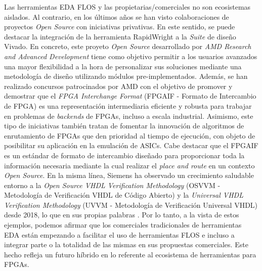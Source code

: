 Las herramientas EDA FLOS y las propietarias/comerciales no son ecosistemas aislados.
Al contrario, en los últimos años se han visto colaboraciones de proyectos \textit{Open Source} con iniciativas privativas.
En este sentido, se puede destacar la integración de la herramienta RapidWright \cite{gh:rapid} a la \textit{Suite} de diseño Vivado.
En concreto, este proyeto \textit{Open Source} desarrollado por \textit{AMD Research and Advanced Development} tiene como objetivo permitir a los usuarios avanzados una mayor flexibilidad a la hora de personalizar sus soluciones mediante una metodología de diseño utilizando módulos pre-implementados.
Además, se han realizado concursos \cite{contest} patrocinados por AMD con el objetivo de promover y demostrar que el \textit{FPGA Interchange Format} (FPGAIF - Formato de Intercambio de FPGA) \cite{FPGAIF} es una representación intermediaria eficiente y robusta para trabajar en problemas de \textit{backends} de FPGAs, incluso a escala industrial.
Asimismo, este tipo de iniciativas también tratan de fomentar la innovación de algoritmos de enrutamiento de FPGAs que den prioridad al tiempo de ejecución, con objeto de posibilitar su aplicación en la emulación de ASICs.
Cabe destacar que el FPGAIF es un estándar de formato de intercambio diseñado para proporcionar toda la información necesaria mediante la cual realizar el \textit{place and route} en un contexto \textit{Open Source}.
En la misma línea, Siemens ha observado un crecimiento saludable entorno a la \textit{Open Source VHDL Verification Methodology} (OSVVM - Metodología de Verificación VHDL de Código Abierto) \cite{osvvm} y la \textit{Universal VHDL Verification Methodology} (UVVM -  Metodología de Verificación Universal VHDL) \cite{uvvm} desde 2018, lo que en sus propias palabras  \cite{wilson-research}.
Por lo tanto, a la vista de estos ejemplos, podemos afirmar que los comerciales tradicionales de herramientas EDA están empezando a facilitar el uso de herramientas FLOS e incluso a integrar parte o la totalidad de las mismas en sus propuestas comerciales.
Este hecho refleja un futuro híbrido en lo referente al ecosistema de herramientas para FPGAs.


